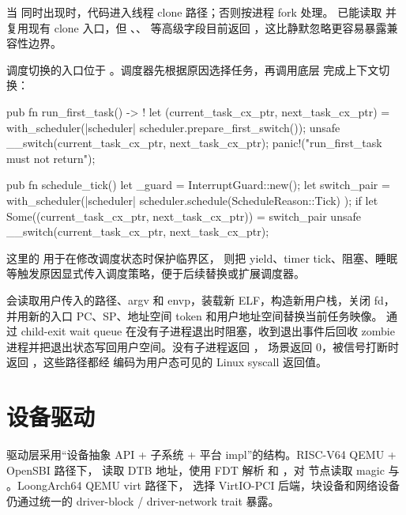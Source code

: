 当  同时出现时，代码进入线程 clone 路径；否则按进程 fork 处理。 已能读取  并复用现有 clone 入口，但 、、 等高级字段目前返回 ，这比静默忽略更容易暴露兼容性边界。

调度切换的入口位于 。调度器先根据原因选择任务，再调用底层  完成上下文切换：

\begin{rustcode}
pub fn run_first_task() -> ! {
    let (current_task_cx_ptr, next_task_cx_ptr) =
        with_scheduler(|scheduler| scheduler.prepare_first_switch());
    unsafe {
        __switch(current_task_cx_ptr, next_task_cx_ptr);
    }
    panic!("run_first_task must not return");
}

pub fn schedule_tick() {
    let _guard = InterruptGuard::new();
    let switch_pair = with_scheduler(|scheduler| {
        scheduler.schedule(ScheduleReason::Tick)
    });
    if let Some((current_task_cx_ptr, next_task_cx_ptr)) = switch_pair {
        unsafe {
            __switch(current_task_cx_ptr, next_task_cx_ptr);
        }
    }
}
\end{rustcode}

这里的  用于在修改调度状态时保护临界区， 则把 yield、timer tick、阻塞、睡眠等触发原因显式传入调度策略，便于后续替换或扩展调度器。

 会读取用户传入的路径、argv 和 envp，装载新 ELF，构造新用户栈，关闭  fd，并用新的入口 PC、SP、地址空间 token 和用户地址空间替换当前任务映像。 通过 child-exit wait queue 在没有子进程退出时阻塞，收到退出事件后回收 zombie 进程并把退出状态写回用户空间。没有子进程返回 ， 场景返回 0，被信号打断时返回 ，这些路径都经  编码为用户态可见的 Linux syscall 返回值。

\section{设备驱动}

驱动层采用“设备抽象 API + 子系统 + 平台 impl”的结构。RISC-V64 QEMU + OpenSBI 路径下， 读取 DTB 地址，使用 FDT 解析  和 ，对  节点读取 magic 与 。LoongArch64 QEMU virt 路径下， 选择 VirtIO-PCI 后端，块设备和网络设备仍通过统一的 driver-block / driver-network trait 暴露。

